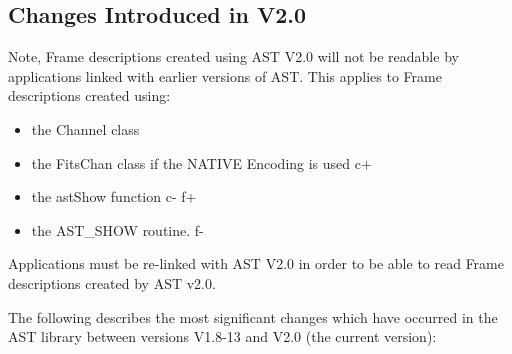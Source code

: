 \documentclass[twoside,11pt]{article}
\begin{document}
\subsection{Changes Introduced in V2.0}

Note, Frame descriptions created using AST V2.0 will not be readable by 
applications linked with earlier versions of AST. This applies to Frame
descriptions created using:
\begin{itemize}
\item the Channel class
\item the FitsChan class if the NATIVE Encoding is used
c+
\item the astShow function
c-
f+
\item the AST\_SHOW routine.
f-
\end{itemize}

Applications must be re-linked with AST V2.0 in order to be able to read
Frame descriptions created by AST v2.0.

The following describes the most significant changes which have
occurred in the AST library between versions V1.8-13 and V2.0 (the
current version):
\end{document}

